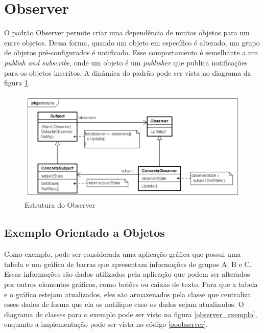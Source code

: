 \section{Observer}

O padrão Observer permite criar uma dependência de muitos 
objetos para um entre objetos. Dessa forma, quando um 
objeto em específico é alterado, um grupo de objetos 
pré-configurados é notificado. Esse comportamento é 
semelhante a um \textit{publish and subscribe}, onde 
um objeto é um \textit{publisher} que publica notificações 
para os objetos inscritos. A dinâmica do padrão pode ser 
vista no diagrama da figura \ref{observer_struct}.

\begin{figure}[htb]
	\caption{\label{observer_struct}Estrutura do Observer}
	\begin{center}
	    \includegraphics[scale=0.5]{5_padroes-contexto-funcional/5.3_comportamentais/5.3.07_observer/observer_estrutura.png}
	\end{center}
\end{figure}

\subsection*{Exemplo Orientado a Objetos}

Como exemplo, pode ser considerada uma aplicação 
gráfica que possui uma tabela e um gráfico de 
barras que apresentam informações de grupos 
A, B e C. Essas informações são dados utilizados 
pela aplicação que podem ser alterados por outros 
elementos gráficos, como botões ou caixas de texto. 
Para que a tabela e o gráfico estejam atualizados, 
eles são armazenados pela classe que centraliza 
esses dados de forma que ela os notifique 
caso os dados sejam atualizados. O diagrama 
de classes para o exemplo pode ser visto na figura 
\ref{observer_exemplo}, enquanto a implementação 
pode ser vista no código \ref{ooobserver}.

